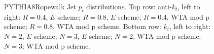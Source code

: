 \begin{figure}[H]
\hfill
{}\hfill
\caption{PYTHIA8Ropewalk Jet $p_t$ distributions. Top row: anti-$k_t$, left to right: $R=0.4$, $E$ scheme; $R=0.8$, $E$ scheme; $R=0.4$, WTA mod p scheme; $R=0.8$, WTA mod p scheme. Bottom row: $k_t$, left to right: $N=2$, $E$ scheme; $N=3$, $E$ scheme; $N=2$, WTA mod p scheme; $N=3$; WTA mod p scheme.}  
\end{figure}

